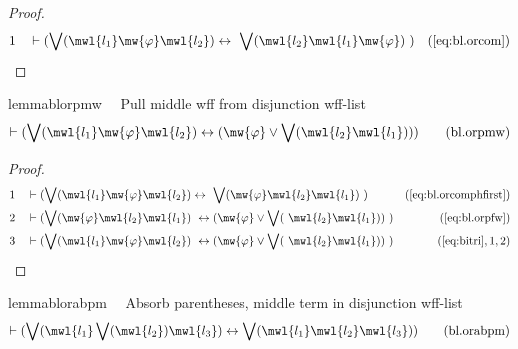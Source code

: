 \begin{proof}
\begin{align}
  1 &&  & \vdash ( \bigvee( \mwl{l_1} \mw{\varphi} \mwl{l_2} ) \leftrightarrow
     ~\bigvee( \mwl{l_2} \mwl{l_1} \mw{\varphi} )
     ~)&(\mbox{\ref{eq:bl.orcom}})\notag
\end{align}
\end{proof}

\begin{restatable}{lemma}{blorpmw}~~ Pull middle wff from disjunction wff-list
\begin{align}
\vdash ( \bigvee( \mwl{l_1} \mw{\varphi} \mwl{l_2} ) \leftrightarrow (
    \mw{\varphi} \vee \bigvee( \mwl{l_2} \mwl{l_1} ) )
    )\label{eq:bl.orpmw}\tag{bl.orpmw}
\end{align}
\end{restatable}

\begin{proof}
\begin{align}
  1 &&  & \vdash ( \bigvee( \mwl{l_1} \mw{\varphi} \mwl{l_2} ) \leftrightarrow
     ~\bigvee( \mw{\varphi} \mwl{l_2} \mwl{l_1} )
     ~)&(\mbox{\ref{eq:bl.orcomphfirst}})\notag
  \\ 2 &&  & \vdash ( \bigvee( \mw{\varphi} \mwl{l_2} \mwl{l_1} )
     ~\leftrightarrow ( \mw{\varphi} \vee \bigvee(
     ~\mwl{l_2} \mwl{l_1} ) )
     ~)&(\mbox{\ref{eq:bl.orpfw}})\notag
  \\ 3 &&  & \vdash ( \bigvee( \mwl{l_1} \mw{\varphi} \mwl{l_2} )
     ~\leftrightarrow ( \mw{\varphi} \vee \bigvee(
     ~\mwl{l_2} \mwl{l_1} ) )
     ~)&(\mbox{\ref{eq:bitri}},1,2)\notag
\end{align}
\end{proof}

\begin{restatable}{lemma}{blorabpm}~~ Absorb parentheses, middle term in
disjunction wff-list
\begin{align}
\vdash ( \bigvee( \mwl{l_1} \bigvee( \mwl{l_2} ) \mwl{l_3} ) \leftrightarrow
    \bigvee( \mwl{l_1} \mwl{l_2} \mwl{l_3} )
    )\label{eq:bl.orabpm}\tag{bl.orabpm}
\end{align}
\end{restatable}

